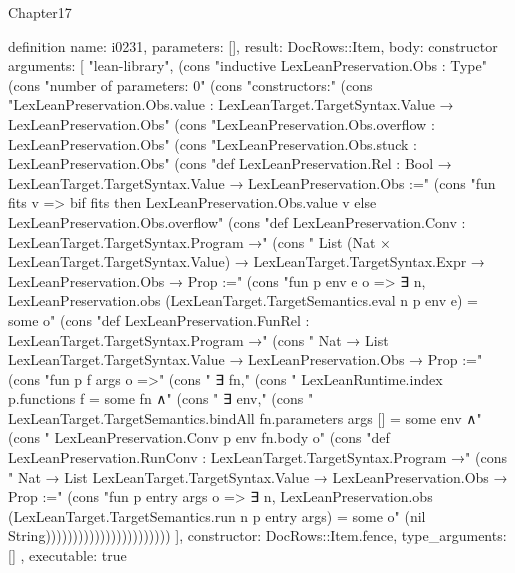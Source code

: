 \begin{lexlean}{Chapter17}
\begin{semanticmodule}
definition{
  name: i0231,
  parameters: [],
  result: DocRows::Item,
  body: constructor{
    arguments: [
      "lean-library",
      (cons "inductive LexLeanPreservation.Obs : Type" (cons "number of parameters: 0" (cons "constructors:" (cons "LexLeanPreservation.Obs.value : LexLeanTarget.TargetSyntax.Value → LexLeanPreservation.Obs" (cons "LexLeanPreservation.Obs.overflow : LexLeanPreservation.Obs" (cons "LexLeanPreservation.Obs.stuck : LexLeanPreservation.Obs" (cons "def LexLeanPreservation.Rel : Bool → LexLeanTarget.TargetSyntax.Value → LexLeanPreservation.Obs :=" (cons "fun fits v => bif fits then LexLeanPreservation.Obs.value v else LexLeanPreservation.Obs.overflow" (cons "def LexLeanPreservation.Conv : LexLeanTarget.TargetSyntax.Program →" (cons "  List (Nat × LexLeanTarget.TargetSyntax.Value) → LexLeanTarget.TargetSyntax.Expr → LexLeanPreservation.Obs → Prop :=" (cons "fun p env e o => ∃ n, LexLeanPreservation.obs (LexLeanTarget.TargetSemantics.eval n p env e) = some o" (cons "def LexLeanPreservation.FunRel : LexLeanTarget.TargetSyntax.Program →" (cons "  Nat → List LexLeanTarget.TargetSyntax.Value → LexLeanPreservation.Obs → Prop :=" (cons "fun p f args o =>" (cons "  ∃ fn," (cons "    LexLeanRuntime.index p.functions f = some fn ∧" (cons "      ∃ env," (cons "        LexLeanTarget.TargetSemantics.bindAll fn.parameters args [] = some env ∧" (cons "          LexLeanPreservation.Conv p env fn.body o" (cons "def LexLeanPreservation.RunConv : LexLeanTarget.TargetSyntax.Program →" (cons "  Nat → List LexLeanTarget.TargetSyntax.Value → LexLeanPreservation.Obs → Prop :=" (cons "fun p entry args o => ∃ n, LexLeanPreservation.obs (LexLeanTarget.TargetSemantics.run n p entry args) = some o" (nil String)))))))))))))))))))))))
    ],
    constructor: DocRows::Item.fence,
    type_arguments: []
  },
  executable: true
}


\end{semanticmodule}
\end{lexlean}
